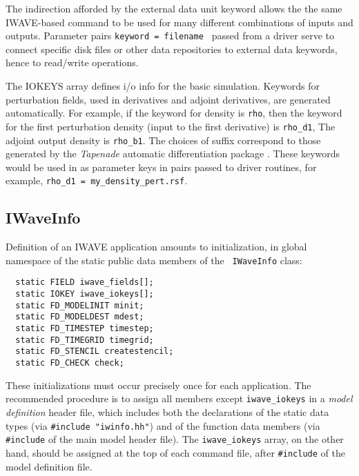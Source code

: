 The indirection afforded by the external data unit keyword allows the
the same IWAVE-based command to be used for many different
combinations of inputs and outputs. Parameter
pairs {\tt keyword = filename } passed from a driver serve to connect
specific disk files or other data repositories to external data
keywords, hence to read/write operations.

The IOKEYS array defines i/o info for the basic simulation. Keywords
for perturbation fields, used in derivatives and adjoint derivatives, are generated
automatically. For example, if the keyword for density is {\tt rho},
then the keyword for the first perturbation density (input to the
first derivative) is {\tt rho\_d1}, The adjoint output density
is {\tt rho\_b1}. The choices of suffix correspond to
those generated by the {\em Tapenade} automatic differentiation
package \cite{TapenadeRef13}. These keywords would be used in as parameter keys in pairs
passed to driver routines, for example, {\tt rho\_d1 = my\_density\_pert.rsf}.

\subsection{IWaveInfo}
Definition of an IWAVE application amounts to initialization, in
global namespace of the static public data members of the {\tt
  IWaveInfo} class:
\begin{verbatim}
  static FIELD iwave_fields[]; 
  static IOKEY iwave_iokeys[];
  static FD_MODELINIT minit;
  static FD_MODELDEST mdest;
  static FD_TIMESTEP timestep;
  static FD_TIMEGRID timegrid;
  static FD_STENCIL createstencil;
  static FD_CHECK check;
\end{verbatim}
These initializations must occur precisely once for each application. The recommended
procedure is to assign all members except {\tt iwave\_iokeys} in
a {\em model definition}  header file, which includes both the declarations of the
static data types (via {\tt \#include "iwinfo.hh"}) and of the
function data members (via {\tt \#include} of the main model header
file).  The {\tt iwave\_iokeys} array, on the other hand, should be
assigned at the top of each command file, after {\tt \#include} of the
model definition file. 

